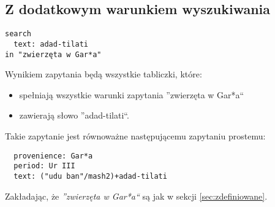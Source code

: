 \subsection{Z dodatkowym warunkiem wyszukiwania}
\begin{verbatim}
search
  text: adad-tilati
in "zwierzęta w Gar*a"
\end{verbatim}
Wynikiem zapytania będą wszystkie tabliczki, które:
\begin{itemize}
 \item spełniają wszystkie warunki zapytania ''zwierzęta w Gar*a``
\item zawierają słowo ''adad-tilati``.
\end{itemize}
Takie zapytanie jest równoważne następującemu zapytaniu prostemu:
\begin{verbatim}
  provenience: Gar*a
  period: Ur III
  text: ("udu ban"/mash2)+adad-tilati
\end{verbatim}
Zakładając, że \textit{''zwierzęta w Gar*a``} są jak w sekcji \ref{sec:zdefiniowane}.

